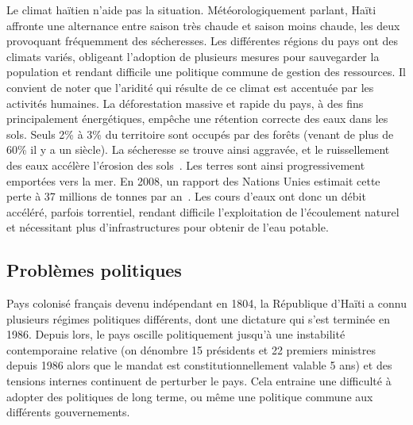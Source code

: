 \documentclass{EPL-master-thesis-covers-FR}
\begin{document}
				Le climat haïtien n'aide pas la situation. Météorologiquement parlant, Haïti affronte une alternance entre saison très chaude et saison moins chaude, les deux provoquant fréquemment des sécheresses. Les différentes régions du pays ont des climats variés, obligeant l'adoption de plusieurs mesures pour sauvegarder la population et rendant difficile une politique commune de gestion des ressources. Il convient de noter que l'aridité qui résulte de ce climat est accentuée par les activités humaines. La déforestation massive et rapide du pays, à des fins principalement énergétiques, empêche une rétention correcte des eaux dans les sols. Seuls 2\% à 3\% du territoire sont occupés par des forêts (venant de plus de 60\% il y a un siècle). La sécheresse se trouve ainsi aggravée, et le ruissellement des eaux accélère l'érosion des sols~\cite{ref:desertification_of_haiti}. Les terres sont ainsi progressivement emportées vers la mer. En 2008, un rapport des Nations Unies estimait cette perte à 37 millions de tonnes par an~\cite{ref:impact_degradation_terre}. Les cours d'eaux ont donc un débit accéléré, parfois torrentiel, rendant difficile l'exploitation de l'écoulement naturel et nécessitant plus d'infrastructures pour obtenir de l'eau potable.

			\subsection*{Problèmes politiques}

				Pays colonisé français devenu indépendant en 1804, la République d'Haïti a connu plusieurs régimes politiques différents, dont une dictature qui s'est terminée en 1986. Depuis lors, le pays oscille politiquement jusqu'à une instabilité contemporaine relative (on dénombre 15 présidents et 22 premiers ministres depuis 1986 alors que le mandat est constitutionnellement valable 5 ans) et des tensions internes continuent de perturber le pays. Cela entraine une difficulté à adopter des politiques de long terme, ou même une politique commune aux différents gouvernements.
\end{document}
